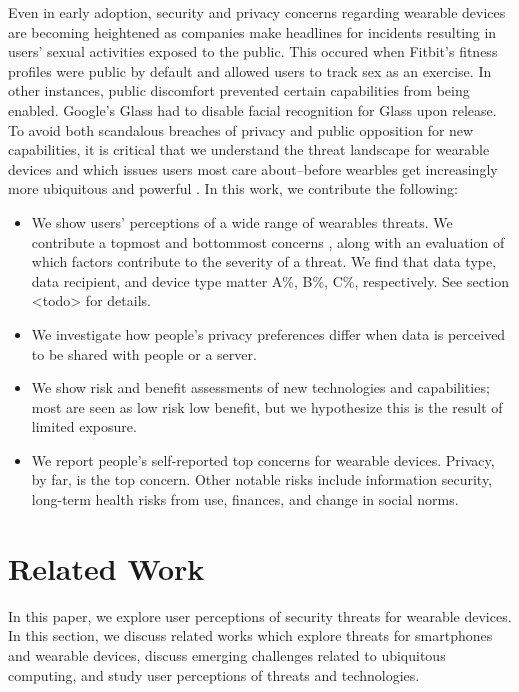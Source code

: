 \documentclass{acm_proc_article-sp}
\begin{document}
Even in early adoption, security and privacy concerns regarding wearable devices are becoming heightened as companies make headlines for incidents resulting in users' sexual activities exposed to the public. This occured when Fitbit's fitness profiles were public by default and allowed users to track sex as an exercise\cite{Fitbit}. In other instances, public discomfort prevented certain capabilities from being enabled. Google's Glass had to disable facial recognition for Glass \cite{GlassDetection} upon release. To avoid both scandalous breaches of privacy and public opposition for new capabilities, it is critical that we understand the threat landscape for wearable devices and which issues users most care about--before wearbles get increasingly more ubiquitous and powerful \cite{Implants}. In this work, we contribute the following: \\[-0.8cm]

\begin{itemize} \itemsep1pt \parskip0pt 
\item We show users' perceptions of a wide range of wearables threats. We contribute a topmost and bottommost concerns , along with an evaluation of which factors contribute to the severity of a threat. We find that data type, data recipient, and device type matter A\%, B\%, C\%, respectively. See section <todo> for details.  
\item We investigate how people's privacy preferences differ when data is perceived to be shared with people or a server.
\item We show risk and benefit assessments of new technologies and capabilities; most are seen as low risk low benefit, but we hypothesize this is  the result of limited exposure. 
\item We report people's self-reported top concerns for wearable devices. Privacy, by far, is the top concern. Other notable risks include information security, long-term health risks from use, finances, and change in social norms. 
\end{itemize}


\section{Related Work}
In this paper, we explore user perceptions of security threats for wearable devices. In this section, we discuss related works which explore threats for smartphones and wearable devices, discuss emerging challenges related to ubiquitous computing, and study user perceptions of threats and technologies. 
\end{document}
